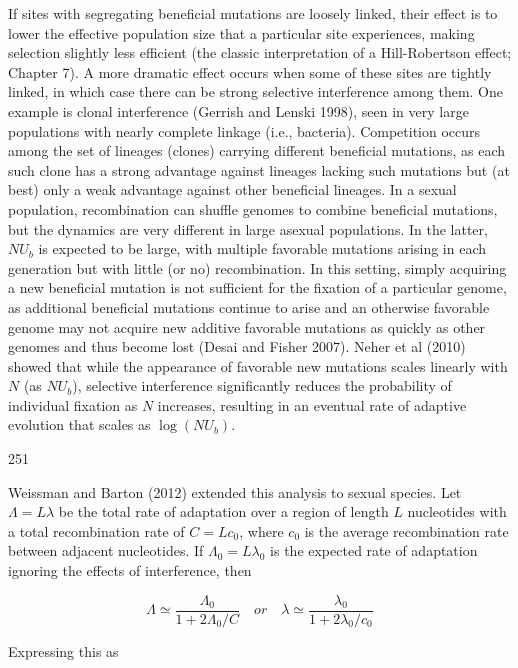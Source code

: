 \documentclass{article}
\begin{document}
If sites with segregating beneficial mutations are loosely linked, their effect is to lower the effective population size that a particular site experiences, making selection slightly less efficient (the classic interpretation of a Hill-Robertson effect; Chapter 7). A more dramatic effect occurs when some of these sites are tightly linked, in which case there can be strong selective interference among them. One example is clonal interference (Gerrish and Lenski 1998), seen in very large populations with nearly complete linkage (i.e., bacteria). Competition occurs among the set of lineages (clones) carrying different beneficial mutations, as each such clone has a strong advantage against lineages lacking such mutations but (at best) only a weak advantage against other beneficial lineages. In a sexual population, recombination can shuffle genomes to combine beneficial mutations, but the dynamics are very different in large asexual populations. In the latter,  $ NU_b $ is expected to be large, with multiple favorable mutations arising in each generation but with little (or no) recombination. In this setting, simply acquiring a new beneficial mutation is not sufficient for the fixation of a particular genome, as additional beneficial mutations continue to arise and an otherwise favorable genome may not acquire new additive favorable mutations as quickly as other genomes and thus become lost (Desai and Fisher 2007). Neher et al (2010) showed that while the appearance of favorable new mutations scales linearly with  $ N $ (as  $ NU_b $), selective interference significantly reduces the probability of individual fixation as  $ N $ increases, resulting in an eventual rate of adaptive evolution that scales as  $ \log(NU_b) $.

251

Weissman and Barton (2012) extended this analysis to sexual species. Let  $ \Lambda = L\lambda $ be the total rate of adaptation over a region of length  $ L $ nucleotides with a total recombination rate of  $ C = Lc_0 $, where  $ c_0 $ is the average recombination rate between adjacent nucleotides. If  $ \Lambda_0 = L\lambda_0 $ is the expected rate of adaptation ignoring the effects of interference, then

\begin{equation}
\Lambda\simeq\frac{\Lambda_{0}}{1+2\Lambda_{0}/C}\quad or\quad\lambda\simeq\frac{\lambda_{0}}{1+2\lambda_{0}/c_{0}}
\tag{8.27a}
\label{eq:8_27a}
\end{equation}

Expressing this as
\end{document}

